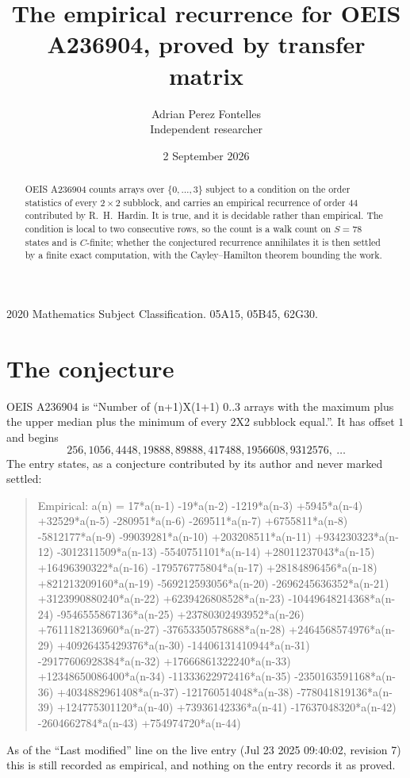 \documentclass[11pt,a4paper]{article}
\title{The empirical recurrence for OEIS A236904, proved by transfer matrix}
\author{Adrian Perez Fontelles\\ \small Independent researcher}
\date{2 September 2026}
\theoremstyle{plain}
\theoremstyle{definition}
\begin{document}
\maketitle

\begin{abstract}
OEIS A236904 counts arrays over $\{0,\dots,3\}$ subject to a condition on the order
statistics of every $2\times2$ subblock, and carries an empirical recurrence of order
$44$ contributed by R.~H.~Hardin. It is true, and it is decidable rather than empirical.
The condition is local to two consecutive rows, so the count is a walk count on $S=78$
states and is $C$-finite; whether the conjectured recurrence annihilates it is then settled by
a finite exact computation, with the Cayley--Hamilton theorem bounding the work.
\end{abstract}

\noindent\small 2020 Mathematics Subject Classification. 05A15, 05B45, 62G30.\normalsize

\section{The conjecture}

OEIS A236904 is ``Number of (n+1)X(1+1) 0..3 arrays with the maximum plus the upper median plus the minimum of every 2X2 subblock equal.''. It has offset $1$ and begins
\[
256, 1056, 4448, 19888, 89888, 417488, 1956608, 9312576,\ \dots
\]
The entry states, as a conjecture contributed by its author and never marked settled:
\begin{quote}
Empirical: a(n) = 17*a(n-1) -19*a(n-2) -1219*a(n-3) +5945*a(n-4) +32529*a(n-5) -280951*a(n-6) -269511*a(n-7) +6755811*a(n-8) -5812177*a(n-9) -99039281*a(n-10) +203208511*a(n-11) +934230323*a(n-12) -3012311509*a(n-13) -5540751101*a(n-14) +28011237043*a(n-15) +16496390322*a(n-16) -179576775804*a(n-17) +28184896456*a(n-18) +821213209160*a(n-19) -569212593056*a(n-20) -2696245636352*a(n-21) +3123990880240*a(n-22) +6239426808528*a(n-23) -10449648214368*a(n-24) -9546555867136*a(n-25) +23780302493952*a(n-26) +7611182136960*a(n-27) -37653350578688*a(n-28) +2464568574976*a(n-29) +40926435429376*a(n-30) -14406131410944*a(n-31) -29177606928384*a(n-32) +17666861322240*a(n-33) +12348650086400*a(n-34) -11333622972416*a(n-35) -2350163591168*a(n-36) +4034882961408*a(n-37) -121760514048*a(n-38) -778041819136*a(n-39) +124775301120*a(n-40) +73936142336*a(n-41) -17637048320*a(n-42) -2604662784*a(n-43) +754974720*a(n-44)
\end{quote}
As of the ``Last modified'' line on the live entry (Jul 23 2025 09:40:02, revision 7) this is still
recorded as empirical, and nothing on the entry records it as proved.
\end{document}
